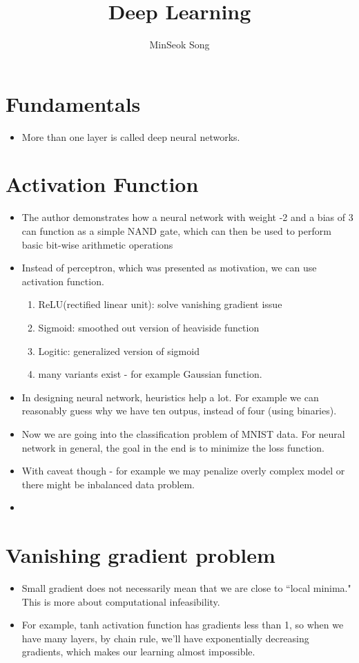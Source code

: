 \documentclass[11pt,reqno]{amsart}
\title{Deep Learning}
\author{MinSeok Song}
\date{}
\theoremstyle{remark}
\begin{document}
\begin{sloppypar}
\section*{Fundamentals}
\begin{itemize}
\item More than one layer is called deep neural networks.

\end{itemize}
\section*{Activation Function}
\begin{itemize}
\item The author demonstrates how a neural network with weight 
-2 and a bias of 3 can function as a simple NAND gate, which can then 
be used to perform basic bit-wise arithmetic operations
\item Instead of perceptron, which was presented as motivation, we can use activation function.
\begin{enumerate}
\item ReLU(rectified linear unit): solve vanishing gradient issue
\item Sigmoid: smoothed out version of heaviside function
\item Logitic: generalized version of sigmoid
\item many variants exist - for example Gaussian function.
\end{enumerate}
\item In designing neural network, heuristics help a lot. For example 
we can reasonably guess why we have ten outpus, instead of four (using binaries).
\item Now we are going into the classification problem of MNIST data. For neural network in general, 
the goal in the end is to minimize the loss function. 
\item With caveat though - for example we may penalize overly complex model or there might be 
inbalanced data problem.
\item 
\end{itemize}
\section*{Vanishing gradient problem}
\begin{itemize}
\item Small gradient does not necessarily mean that we are close to ``local minima." This is more about computational infeasibility.
\item For example, tanh activation function has gradients less than 1, so when we have many layers, by chain rule, we'll have exponentially decreasing gradients, 
which makes our learning almost impossible.
\end{itemize}

\end{sloppypar}
\end{document}
